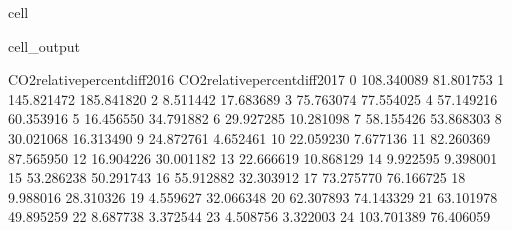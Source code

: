 \documentclass[letterpaper,10pt,english]{jupyterBook}
\begin{document}
\begin{sphinxuseclass}{cell}
\begin{sphinxVerbatimOutput}
\begin{sphinxuseclass}{cell_output}
\begin{sphinxVerbatim}[commandchars=\\\{\}]
    CO2\PYGZus{}relative\PYGZus{}percent\PYGZus{}diff\PYGZus{}2016  CO2\PYGZus{}relative\PYGZus{}percent\PYGZus{}diff\PYGZus{}2017  \PYGZbs{}
0                      \PYGZhy{}108.340089                      \PYGZhy{}81.801753   
1                      \PYGZhy{}145.821472                     \PYGZhy{}185.841820   
2                        \PYGZhy{}8.511442                      \PYGZhy{}17.683689   
3                        75.763074                       77.554025   
4                        57.149216                       60.353916   
5                       \PYGZhy{}16.456550                      \PYGZhy{}34.791882   
6                        29.927285                      \PYGZhy{}10.281098   
7                        58.155426                       53.868303   
8                        30.021068                       16.313490   
9                       \PYGZhy{}24.872761                        4.652461   
10                       22.059230                        7.677136   
11                       82.260369                       87.565950   
12                       16.904226                       30.001182   
13                      \PYGZhy{}22.666619                      \PYGZhy{}10.868129   
14                        9.922595                        9.398001   
15                       53.286238                       50.291743   
16                      \PYGZhy{}55.912882                      \PYGZhy{}32.303912   
17                       73.275770                       76.166725   
18                       \PYGZhy{}9.988016                      \PYGZhy{}28.310326   
19                       \PYGZhy{}4.559627                       32.066348   
20                      \PYGZhy{}62.307893                      \PYGZhy{}74.143329   
21                       63.101978                       49.895259   
22                       \PYGZhy{}8.687738                       \PYGZhy{}3.372544   
23                        4.508756                        3.322003   
24                      103.701389                       76.406059   


\end{sphinxVerbatim}
\end{sphinxuseclass}
\end{sphinxVerbatimOutput}
\end{sphinxuseclass}
\end{document}
